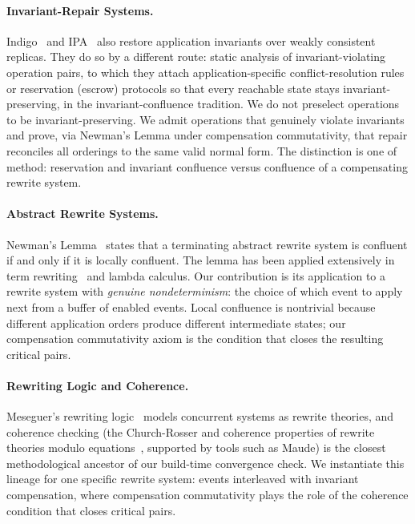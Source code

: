 \documentclass[11pt,a4paper]{article}
\theoremstyle{plain}
\theoremstyle{definition}
\theoremstyle{remark}
\begin{document}
\paragraph{Invariant-Repair Systems.}
Indigo~\cite{balegas2015indigo} and IPA~\cite{balegas2019ipa} also restore
application invariants over weakly consistent replicas.  They do so by a
different route: static analysis of invariant-violating operation pairs, to
which they attach application-specific conflict-resolution rules or reservation
(escrow) protocols so that every reachable state stays invariant-preserving, in
the invariant-confluence tradition.  We do not preselect operations to be
invariant-preserving.  We admit operations that genuinely violate invariants and
prove, via Newman's Lemma under compensation commutativity, that repair
reconciles all orderings to the same valid normal form.  The distinction is one
of method: reservation and invariant confluence versus confluence of a
compensating rewrite system.

\paragraph{Abstract Rewrite Systems.}
Newman's Lemma~\cite{newman1942} states that a terminating abstract rewrite
system is confluent if and only if it is locally confluent.  The lemma has been
applied extensively in term rewriting~\cite{baader1998term} and lambda
calculus.  Our contribution is its application to a rewrite system with
\emph{genuine nondeterminism}: the choice of which event to apply next from a
buffer of enabled events.  Local confluence is nontrivial because different
application orders produce different intermediate states; our compensation
commutativity axiom is the condition that closes the resulting critical pairs.

\paragraph{Rewriting Logic and Coherence.}
Meseguer's rewriting logic~\cite{meseguer1992} models concurrent systems as
rewrite theories, and coherence checking (the Church-Rosser and coherence
properties of rewrite theories modulo equations~\cite{duran2012coherence},
supported by tools such as Maude) is the closest methodological ancestor of our
build-time convergence check.  We instantiate this lineage for one specific
rewrite system: events interleaved with invariant compensation, where
compensation commutativity plays the role of the coherence condition that closes
critical pairs.
\end{document}
